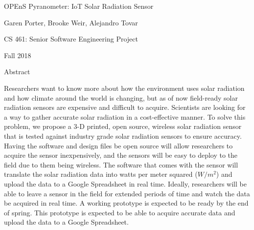 \documentclass[10pt,draftclsnofoot,onecolumn,letterpaper]{article}
\begin{document}
    \begin{Center}
    {\fontsize{14pt}{16.8pt}\selectfont OPEnS Pyranometer: IoT Solar Radiation Sensor\par}
    \end{Center}\par
        
    \begin{Center}
    Garen Porter, Brooke Weir, Alejandro Tovar
    \end{Center}\par
        
    \begin{Center}
    CS 461: Senior Software Engineering Project
    \end{Center}\par
        
    \begin{Center}
    Fall 2018
    \end{Center}\par
        
    \begin{Center}
    {\fontsize{14pt}{16.8pt}\selectfont Abstract\par}
    \end{Center}\par
        
    {\fontsize{10pt}{12.0pt}\selectfont Researchers want to know more about how the environment uses solar radiation and how climate around the world is changing, but as of now field-ready solar radiation sensors are expensive and difficult to acquire. Scientists are looking for a way to gather accurate solar radiation in a cost-effective manner. To solve this problem, we propose a 3-D printed, open source, wireless solar radiation sensor that is tested against industry grade solar radiation sensors to ensure accuracy. Having the software and design files be open source will allow researchers to acquire the sensor inexpensively, and the sensors will be easy to deploy to the field due to them being wireless. The software that comes with the sensor will translate the solar radiation data into watts per meter squared ($W/m^2$) and upload the data to a Google Spreadsheet in real time. Ideally, researchers will be able to leave a sensor in the field for extended periods of time and watch the data be acquired in real time. A working prototype is expected to be ready by the end of spring. This prototype is expected to be able to acquire accurate data and upload the data to a Google Spreadsheet.\par}\par
        
\end{document}
